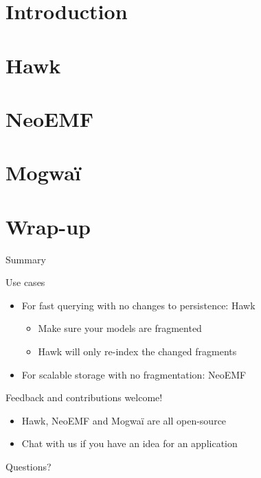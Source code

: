 



\maketitle

\section{Introduction}
\section{Hawk}
\section{NeoEMF}
\section{Mogwa\"i}

\section{Wrap-up}

\begin{frame}{Summary}

  \begin{block}{Use cases}
    \begin{itemize}
    \item For fast querying with no changes to persistence: Hawk
    \begin{itemize}
    \item Make sure your models are fragmented
    \item Hawk will only re-index the changed fragments
    \end{itemize}
    \item For scalable storage with no fragmentation: NeoEMF
    \end{itemize}
  \end{block}

  \begin{block}{Feedback and contributions welcome!}
  \begin{itemize}
  \item Hawk, NeoEMF and Mogwaï are all open-source
  \item Chat with us if you have an idea for an application
  \end{itemize}
  \end{block}

\end{frame}

\appendix

{
\begin{frame}[standout]
  Questions?
\end{frame}
}



